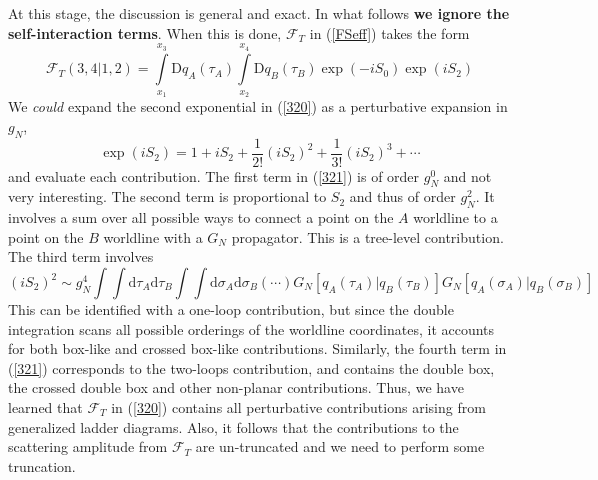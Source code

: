 At this stage, the discussion is general and exact. In what follows \textbf{we ignore the self-interaction terms}. When this is done, $\mathcal{F}_{T}$ in (\ref{FSeff}) takes the form
\begin{equation}
	\mathcal{F}_{T}(3, 4|1, 2) = \int\limits_{x_{1}}^{x_{3}} \mathrm{D}q_{A}(\tau_{A}) \int\limits_{x_{2}}^{x_{4}} \mathrm{D}q_{B}(\tau_{B}) \exp{\left( - i S_{0} \right)} \exp{\left( i S_{2} \right)} \label{320}
\end{equation}
We \textit{could} expand the second exponential in (\ref{320}) as a perturbative expansion in $g_{N}$,
\begin{equation}
	\exp{\left( i S_{2} \right)} = 1 + i S_{2} + \frac{1}{2!} (i S_{2})^{2} + \frac{1}{3!} (i S_{2})^{3} + \cdots \label{321}
\end{equation}
and evaluate each contribution. The first term in (\ref{321}) is of order $g_{N}^{0}$ and not very interesting. The second term is proportional to $S_{2}$ and thus of order $g_{N}^{2}$. It involves a sum over all possible ways to connect a point on the $A$ worldline to a point on the $B$ worldline with a $G_{N}$ propagator. This is a tree-level contribution. The third term involves
\begin{equation}
	(i S_{2})^{2} \sim g_{N}^{4} \int \int \mathrm{d}\tau_{A} \mathrm{d}\tau_{B} \int \int \mathrm{d}\sigma_{A} \mathrm{d}\sigma_{B} (\cdots) G_{N}[q_{A}(\tau_{A}) | q_{B}(\tau_{B})] G_{N}[q_{A}(\sigma_{A}) | q_{B}(\sigma_{B})]
\end{equation}
This can be identified with a one-loop contribution, but since the double integration scans all possible orderings of the worldline coordinates, it accounts for both box-like and crossed box-like contributions. Similarly, the fourth term in (\ref{321}) corresponds to the two-loops contribution, and contains the double box, the crossed double box and other non-planar contributions. Thus, we have learned that $\mathcal{F}_{T}$ in (\ref{320}) contains all perturbative contributions arising from generalized ladder diagrams. Also, it follows that the contributions to the scattering amplitude from $\mathcal{F}_{T}$ are un-truncated and we need to perform some truncation.

